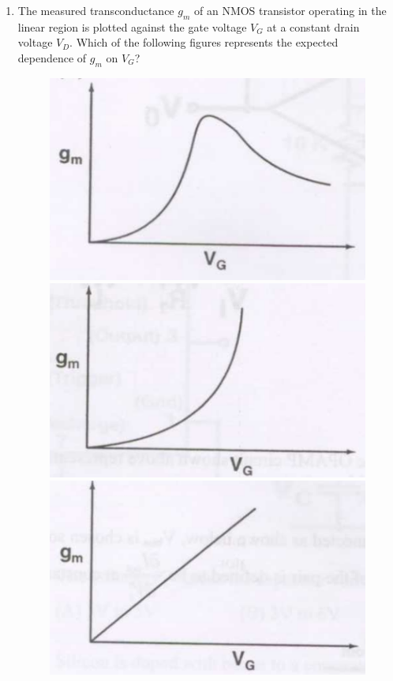 \documentclass[a4paper, 11pt]{article}
\begin{document}
\begin{enumerate}
    \item The measured transconductance $g_m$ of an NMOS transistor operating in the linear region is plotted against the gate voltage $V_G$ at a constant drain voltage $V_D$. Which of the following figures represents the expected dependence of $g_m$ on $V_G$?
    \begin{figure}[H]
        \centering
        \begin{minipage}{0.45\textwidth}
            \centering
            \includegraphics[width=0.8\columnwidth]{figs/q45A.png}
            \centerline{}
        \end{minipage}
        \hfill
        \begin{minipage}{0.45\textwidth}
            \centering
            \includegraphics[width=0.8\columnwidth]{figs/q45B.png}
            \centerline{}
        \end{minipage}
        \vfill
        \begin{minipage}{0.45\textwidth}
            \centering
            \includegraphics[width=0.8\columnwidth]{figs/q45C.png}

\end{minipage}
\end{figure}
\end{enumerate}
\end{document}

